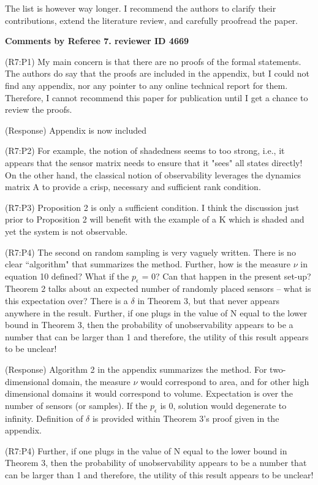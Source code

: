 \documentclass{letter}
\begin{document}
The list is however way longer. I recommend the authors to clarify
their contributions, extend the literature review, and carefully
proofread the paper. 


{\bf Comments by Referee 7. reviewer ID 4669}

{\color{red}(R7:P1)} My main concern is that there are no proofs of the formal
statements. The authors do say that the proofs are included in the
appendix, but I could not find any appendix, nor any pointer to any
online technical report for them. Therefore, I cannot recommend this
paper for publication until I get a chance to review the proofs.

{\color{red}(Response)} Appendix is now included

{\color{red}(R7:P2)} For example, the notion of shadedness seems to too strong, i.e., it appears
that the sensor matrix needs to ensure that it "sees" all states
directly! On the other hand, the classical notion of observability
leverages the dynamics matrix A to provide a crisp, necessary and
sufficient rank condition. 

{\color{red}(R7:P3)} Proposition 2 is only a sufficient condition. I think the discussion
just prior to Proposition 2 will benefit with the example of a K which
is shaded and yet the system is not observable.

{\color{red}(R7:P4)} The second on random sampling is very vaguely written. There is no
clear ``algorithm" that summarizes the method. Further, how is the
measure $ \nu $ in equation 10 defined? What if the $ p_\epsilon $ = 0? Can
that happen in the present set-up? Theorem 2 talks about an expected
number of randomly placed sensors -- what is this expectation over? There is a $ \delta $ in Theorem 3, but that never appears anywhere in the result. Further, if one plugs in the value of N equal to the lower bound in Theorem 3, then the probability of unobservability appears to
be a number that can be larger than 1 and therefore, the utility of
this result appears to be unclear!

{\color{red}(Response)}  Algorithm 2 in the appendix summarizes the method. For two-dimensional domain, the measure $ \nu $ would correspond to area, and for other high dimensional domains it would correspond to volume. Expectation is over the number of sensors (or samples). If the $ p_\epsilon $ is 0, solution would degenerate to infinity. Definition of $ \delta $ is provided  within Theorem 3's proof given in the appendix.  

{\color{red}(R7:P4)} Further, if one plugs in the value of N equal to the lower bound in Theorem 3, then the probability of unobservability appears to be a number that can be larger than 1 and therefore, the utility of this result appears to be unclear!
\end{document}
